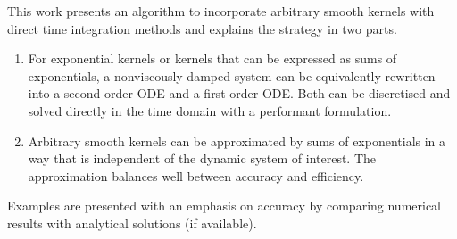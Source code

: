 This work presents an algorithm to incorporate arbitrary smooth kernels with direct time integration methods and explains the strategy in two parts.
\begin{enumerate}
\item For exponential kernels or kernels that can be expressed as sums of exponentials, a nonviscously damped system can be equivalently rewritten into a second-order ODE and a first-order ODE. Both can be discretised and solved directly in the time domain with a performant formulation. 
\item Arbitrary smooth kernels can be approximated by sums of exponentials in a way that is independent of the dynamic system of interest. The approximation balances well between accuracy and efficiency. 
\end{enumerate}
Examples are presented  with an emphasis on accuracy by comparing numerical results with analytical solutions (if available).
